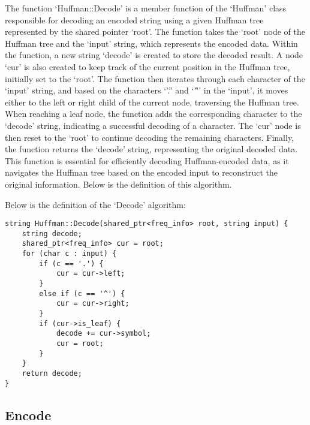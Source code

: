 The function `Huffman::Decode' is a member function of the `Huffman' class responsible for decoding an encoded string using a given Huffman tree represented by the shared pointer `root'. The 
function takes the `root' node of the Huffman tree and the `input' string, which represents the encoded data. Within the function, a new string `decode' is created to store the decoded result. 
A node `cur' is also created to keep track of the current position in the Huffman tree, initially set to the `root'. The function then iterates through each character of the `input' string, 
and based on the characters `'.'' and `'\^'' in the `input', it moves either to the left or right child of the current node, traversing the Huffman tree. When reaching a leaf node, the function 
adds the corresponding character to the `decode' string, indicating a successful decoding of a character. The `cur' node is then reset to the `root' to continue decoding the remaining characters. 
Finally, the function returns the `decode' string, representing the original decoded data. This function is essential for efficiently decoding Huffman-encoded data, as it navigates the Huffman 
tree based on the encoded input to reconstruct the original information. Below is the definition of this algorithm.

\begin{highlight}
    
Below is the definition of the `Decode' algorithm:

\horizontalline

\begin{verbatim}
string Huffman::Decode(shared_ptr<freq_info> root, string input) {
    string decode;
    shared_ptr<freq_info> cur = root;
    for (char c : input) {
        if (c == '.') {
            cur = cur->left;
        }
        else if (c == '^') {
            cur = cur->right;
        }
        if (cur->is_leaf) {
            decode += cur->symbol;
            cur = root;
        }
    }
    return decode;
}
\end{verbatim}

\end{highlight}

\subsection*{Encode}

